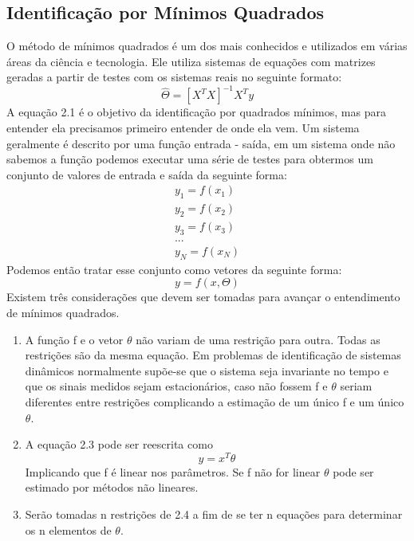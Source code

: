 \subsection{Identificação por Mínimos Quadrados}
O método de mínimos quadrados é um dos mais conhecidos e utilizados em várias áreas da ciência e tecnologia. Ele utiliza sistemas de equações com matrizes geradas a partir de testes com os sistemas reais no seguinte formato:
\begin{equation}
	\hat{\Theta}=[X^TX]^{-1}X^Ty
\end{equation}
A equação 2.1 é o objetivo da identificação por quadrados mínimos, mas para entender ela precisamos primeiro entender de onde ela vem.
\newline 
Um sistema geralmente é descrito por uma função entrada - saída, em um sistema onde não sabemos a função podemos executar uma série de testes para obtermos um conjunto de valores de entrada e saída da seguinte forma:
\begin{equation}
\begin{array}{c}
y_1=f(x_1) \\
y_2=f(x_2) \\
y_3=f(x_3) \\
... \\
y_N=f(x_N)
\end{array}
\end{equation}
Podemos então tratar esse conjunto como vetores da seguinte forma:
\begin{equation}
y=f(x,\Theta)
\end{equation}
Existem três considerações que devem ser tomadas para avançar o entendimento de mínimos quadrados.
\begin{enumerate}
	\item A função f e o vetor $\theta$ não variam de uma restrição para outra. Todas as restrições são da mesma equação. Em problemas de identificação de sistemas dinâmicos normalmente supõe-se que o sistema seja invariante no tempo e que os sinais medidos sejam estacionários, caso não fossem f e $\theta$ seriam diferentes entre restrições complicando a estimação de um único f e um único $\theta$.
	\item A equação 2.3 pode ser reescrita como
	\begin{equation}
	y=x^T \theta
	\end{equation}
	Implicando que f é linear nos parâmetros. Se f não for linear $\theta$ pode ser estimado por métodos não lineares.
	\item Serão tomadas n restrições de 2.4 a fim de se ter n equações para determinar os n elementos de $\theta$.
\end{enumerate}

